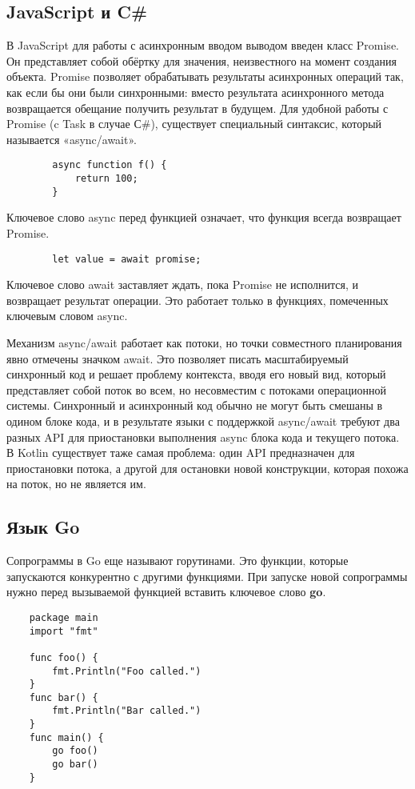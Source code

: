 	\subsection{JavaScript и C\#}
	В JavaScript для работы с асинхронным вводом выводом введен класс Promise.
	Он представляет собой обёртку для значения, неизвестного на момент создания объекта. 
	Promise позволяет обрабатывать результаты асинхронных операций так, как если бы они были синхронными:
	вместо результата асинхронного метода возвращается обещание получить результат в будущем.
	Для удобной работы с Promise (c Task в случае С\#), существует специальный синтаксис, который называется «async/await».
	
	\begin{lstlisting}
		async function f() {
			return 100;
		}
	\end{lstlisting}

	Ключевое слово async перед функцией означает, что функция всегда возвращает Promise.
	
	\begin{lstlisting}
		let value = await promise;
	\end{lstlisting}
	Ключевое слово await заставляет ждать, пока Promise не исполнится, и возвращает результат операции. Это работает только в функциях, помеченных ключевым словом async. 
	
	Механизм async/await работает как потоки, но точки совместного планирования явно отмечены значком
	await. Это позволяет писать масштабируемый синхронный код и решает проблему контекста, вводя
	его	новый вид, который представляет собой поток во всем, но несовместим с потоками операционной
	системы. Синхронный и асинхронный код обычно не могут быть смешаны в одином блоке кода, и в
	результате языки с поддержкой async/await требуют два разных API для приостановки выполнения async
	блока кода и текущего потока. В Kotlin существует таже самая проблема: один API предназначен для
	приостановки потока, а другой для остановки новой конструкции, которая похожа на поток, но не
	является им.
	
	\subsection{Язык Go}
	Сопрограммы в Go еще называют горутинами. Это функции, которые запускаются конкурентно с другими функциями. 
	При запуске новой сопрограммы нужно перед вызываемой функцией вставить ключевое слово \textbf{go}.
	
	\begin{lstlisting}
	package main
	import "fmt"
	
	func foo() {
		fmt.Println("Foo called.")
	}
	func bar() {
		fmt.Println("Bar called.")
	}
	func main() {
		go foo()
		go bar()
	}

	\end{lstlisting}
		
